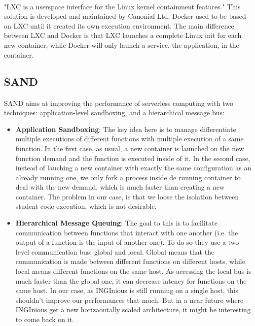 \paragraph{}"LXC is a userspace interface for the Linux kernel containment features."\cite{lxc}  This solution is developed and maintained by Canonial Ltd.  Docker used to be based on LXC until it created its own execution environment.  The main difference between LXC and Docker is that LXC launches a complete Linux init for each new container, while Docker will only launch a service, the application, in the container.

\subsection{SAND} 
\paragraph{}SAND\cite{akkus2018sand} aims at improving the performance of serverless computing with two techniques: application-level sandboxing, and a hierarchical message bus:
\begin{itemize}
\renewcommand\labelitemi{--}
  \item \textbf{Application Sandboxing}: The key idea here is to manage differentiate multiple executions of different functions with multiple execution of a same function.  In the first case, as usual, a new container is launched on the new function demand and the function is executed inside of it.  In the second case, instead of lauching a new container with exactly the same configuration as an already running one, we only fork a process inside de running container to deal with the new demand, which is much faster than creating a new container.  The problem in our case, is that we loose the isolation between student code execution, which is not desirable.
  \item \textbf{Hierarchical Message Queuing}: The goal to this is to facilitate communication between functions that interact with one another (i.e. the output of a function is the input of another one).  To do so they use a two-level communication bus: global and local.  Global means that the communication is made between different functions on different hosts, while local means different functions on the same host.  As accessing the local bus is much faster than the global one, it can decrease latency for functions on the same host.  In our case, as INGInious is still running on a single host, this shouldn't improve our performances that much.  But in a near future where INGInious get a new horizaontally scaled architecture, it might be interesting to come back on it.
\end{itemize}

